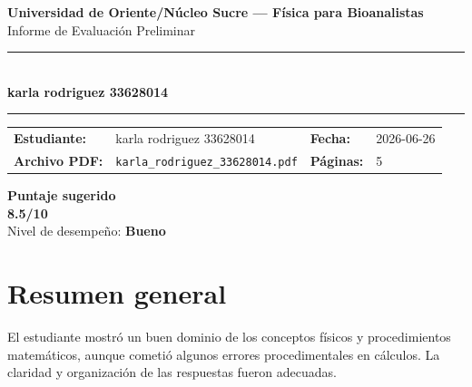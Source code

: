 \documentclass[11pt,a4paper]{article}
\begin{document}
\begin{center}
  {\Large\bfseries\color{azulTitulo} Universidad de Oriente/Núcleo Sucre --- Física para Bioanalistas}\\[4pt]
  {\large Informe de Evaluación Preliminar}\\[12pt]
  \rule{\linewidth}{1.2pt}\\[6pt]
  {\LARGE\bfseries karla rodriguez 33628014}\\[4pt]
  \rule{\linewidth}{0.6pt}
\end{center}

\vspace{4pt}
\begin{tcolorbox}[cajaTitulo, title=Datos del informe]
\begin{tabular}{@{}llll@{}}
  \textbf{Estudiante:}  & karla rodriguez 33628014  &
  \textbf{Fecha:}       & 2026-06-26 \\[4pt]
  \textbf{Archivo PDF:} & \texttt{karla\_rodriguez\_33628014.pdf}  &
  \textbf{Páginas:}     & 5 \\
\end{tabular}
\end{tcolorbox}

\vspace{6pt}
\begin{center}
  \begin{tcolorbox}[
    enhanced,
    colback=white, colframe=desempeno_bueno,
    width=0.62\linewidth,
    boxrule=2pt,
    halign=center, valign=center,
    top=8pt, bottom=8pt,
  ]
    \centering
    {\large\bfseries Puntaje sugerido}\\[6pt]
    {\Huge\bfseries\color{desempeno_bueno} 8.5/10}\\[6pt]
    {\large Nivel de desempeño: \textbf{\color{desempeno_bueno} Bueno}}
  \end{tcolorbox}
\end{center}

\section*{Resumen general}
El estudiante mostró un buen dominio de los conceptos físicos y procedimientos matemáticos, aunque cometió algunos errores procedimentales en cálculos. La claridad y organización de las respuestas fueron adecuadas.
\end{document}
